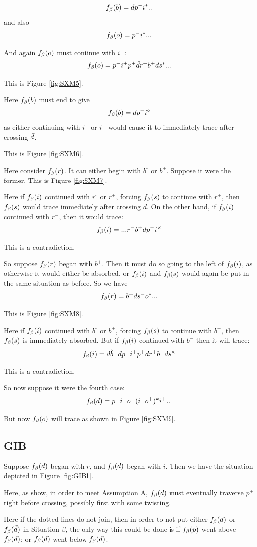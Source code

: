 \[
f_\beta(b) = d p^- i^*..
\]
and also
\[
f_\beta(o) = p^- i^*...
\]

And again $f_\beta(o)$ must continue with $i^+$:
\[
f_\beta(o) = p^- i^+ p^+ \bar{d} r^+ b^+ d s^*...
\]

This is Figure \ref{fig:SXM5}.

Here $f_\beta(b)$ must end to give
\[
f_\beta(b) = d p^- i^\circ
\]
as either continuing with $i^+$ or $i^-$ would cause it to immediately trace after crossing $\bar{d}$.

This is Figure \ref{fig:SXM6}.

Here consider $f_\beta(r)$. It can either begin with $b^\circ$ or $b^+$. Suppose it were the former. This is Figure \ref{fig:SXM7}. 

Here if $f_\beta(i)$ continued with $r^\circ$ or $r^+$, forcing $f_\beta(s)$ to continue with $r^+$, then $f_\beta(s)$ would trace immediately after crossing $d$. On the other hand, if $f_\beta(i)$ continued with $r^-$, then it would trace:
\[
f_\beta(i) = ...r^- b^+ d p^- i^\times
\]

This is a contradiction.

So suppose $f_\beta(r)$ began with $b^+$. Then it must do so going to the left of $f_\beta(i)$, as otherwise it would either be absorbed, or $f_\beta(i)$ and $f_\beta(s)$ would again be put in the same situation as before. So we have
\[
f_\beta(r) = b^+ d s^- o^*...
\]

This is Figure \ref{fig:SXM8}.

Here if $f_\beta(i)$ continued with $b^\circ$ or $b^+$, forcing $f_\beta(s)$ to continue with $b^+$, then $f_\beta(s)$ is immediately absorbed. But if $f_\beta(i)$ continued with $b^-$ then it will trace:
\[
f_\beta(i) = \bar{d} \hat{b}^- d p^- i^+ p^+ \bar{d} r^+ b^+ d s^\times
\]

This is a contradiction.

So now suppose it were the fourth case:
\[
f_\beta(\bar{d}) = p^- i^- o^- (i^- o^+)^k i^+...
\]


But now $f_\beta(o)$ will trace as shown in Figure \ref{fig:SXM9}.

\subsection{GIB}\label{GIB}
Suppose $f_\beta(d)$ began with $r$, and $f_\beta(\bar{d})$ began with $i$. Then we have the situation depicted in Figure \ref{fig:GIB1}.

Here, as show, in order to meet Assumption A, $f_\beta(\bar{d})$ must eventually traverse $p^+$ right before crossing, possibly first with some twisting.

Here if the dotted lines do not join, then in order to not put either $f_\beta(d)$ or $f_\beta(\bar{d})$ in Situation $\beta$, the only way this could be done is if $f_\beta(p)$ went above $f_\beta(d)$; or $f_\beta(\bar{d})$ went below $f_\beta(d)$.

